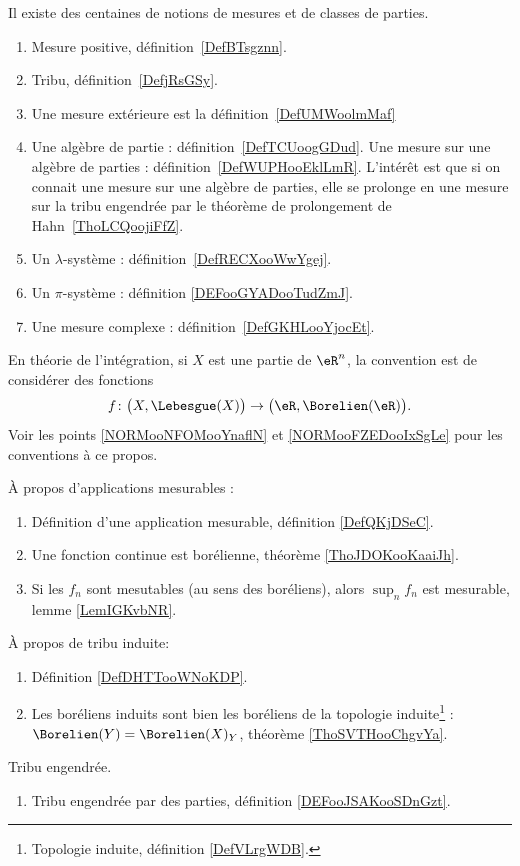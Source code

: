   \label{INTooVDSCooHXLLKp}
Il existe des centaines de notions de mesures et de classes de parties.
\begin{enumerate}
	\item
	      Mesure positive, définition~\ref{DefBTsgznn}.		%
	\item
	      Tribu, définition~\ref{DefjRsGSy}.							%
	\item
	      Une mesure extérieure est la définition~\ref{DefUMWoolmMaf}
	\item
	      Une algèbre de partie : définition~\ref{DefTCUoogGDud}. Une mesure sur une algèbre de parties : définition~\ref{DefWUPHooEklLmR}. L'intérêt est que si on connait une mesure sur une algèbre de parties, elle se prolonge en une mesure sur la tribu engendrée par le théorème de prolongement de Hahn~\ref{ThoLCQoojiFfZ}.
	\item
	      Un \( \lambda\)-système : définition~\ref{DefRECXooWwYgej}.
	\item
	      Un \( \pi\)-système : définition \ref{DEFooGYADooTudZmJ}.
	\item
	      Une mesure complexe : définition~\ref{DefGKHLooYjocEt}.
\end{enumerate}

En théorie de l'intégration, si \( X\) est une partie de \( \eR^n\), la convention est de considérer des fonctions
\[
	f\colon \big( X,\Lebesgue(X) \big)\to \big( \eR,\Borelien(\eR) \big).
\]
Voir les points \ref{NORMooNFOMooYnaflN} et \ref{NORMooFZEDooIxSgLe} pour les conventions à ce propos.

À propos d'applications mesurables :
\begin{enumerate}
	\item
	      Définition d'une application mesurable, définition \ref{DefQKjDSeC}.
	\item
	      Une fonction continue est borélienne, théorème \ref{ThoJDOKooKaaiJh}.
	\item
	      Si les \( f_n\) sont mesutables (au sens des boréliens), alors \( \sup_nf_n\) est mesurable, lemme \ref{LemIGKvbNR}.
\end{enumerate}


À propos de tribu induite:
\begin{enumerate}
	\item
	      Définition \ref{DefDHTTooWNoKDP}.
	\item
	      Les boréliens induits sont bien les boréliens de la topologie induite\footnote{Topologie induite, définition \ref{DefVLrgWDB}.} : \( \Borelien(Y)=\Borelien(X)_Y\), théorème \ref{ThoSVTHooChgvYa}.
\end{enumerate}

Tribu engendrée.
\begin{enumerate}
	\item
	      Tribu engendrée par des parties, définition \ref{DEFooJSAKooSDnGzt}.
\end{enumerate}
